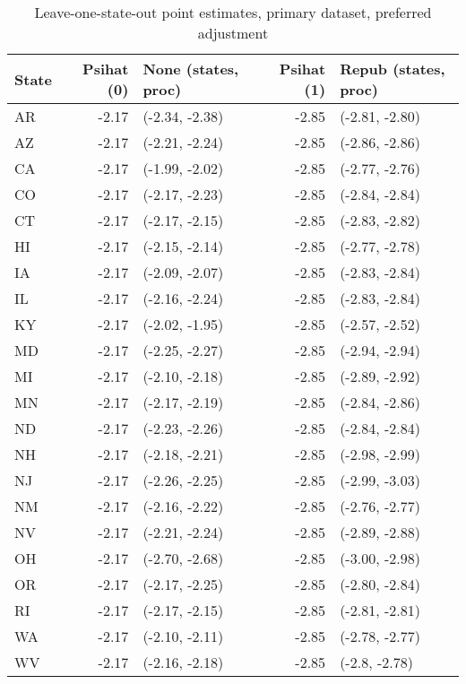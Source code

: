 \begin{table}[ht]
\centering
   \caption{Leave-one-state-out point estimates, primary dataset, preferred adjustment}
    \label{tab:loostatec1}
\begin{tabular}{lrlrl}
  \hline
State & Psihat (0) & None (states, proc) & Psihat (1) & Repub (states, proc) \\ 
  \hline
AR & -2.17 & (-2.34, -2.38) & -2.85 & (-2.81, -2.80) \\ 
  AZ & -2.17 & (-2.21, -2.24) & -2.85 & (-2.86, -2.86) \\ 
  CA & -2.17 & (-1.99, -2.02) & -2.85 & (-2.77, -2.76) \\ 
  CO & -2.17 & (-2.17, -2.23) & -2.85 & (-2.84, -2.84) \\ 
  CT & -2.17 & (-2.17, -2.15) & -2.85 & (-2.83, -2.82) \\ 
  HI & -2.17 & (-2.15, -2.14) & -2.85 & (-2.77, -2.78) \\ 
  IA & -2.17 & (-2.09, -2.07) & -2.85 & (-2.83, -2.84) \\ 
  IL & -2.17 & (-2.16, -2.24) & -2.85 & (-2.83, -2.84) \\ 
  KY & -2.17 & (-2.02, -1.95) & -2.85 & (-2.57, -2.52) \\ 
  MD & -2.17 & (-2.25, -2.27) & -2.85 & (-2.94, -2.94) \\ 
  MI & -2.17 & (-2.10, -2.18) & -2.85 & (-2.89, -2.92) \\ 
  MN & -2.17 & (-2.17, -2.19) & -2.85 & (-2.84, -2.86) \\ 
  ND & -2.17 & (-2.23, -2.26) & -2.85 & (-2.84, -2.84) \\ 
  NH & -2.17 & (-2.18, -2.21) & -2.85 & (-2.98, -2.99) \\ 
  NJ & -2.17 & (-2.26, -2.25) & -2.85 & (-2.99, -3.03) \\ 
  NM & -2.17 & (-2.16, -2.22) & -2.85 & (-2.76, -2.77) \\ 
  NV & -2.17 & (-2.21, -2.24) & -2.85 & (-2.89, -2.88) \\ 
  OH & -2.17 & (-2.70, -2.68) & -2.85 & (-3.00, -2.98) \\ 
  OR & -2.17 & (-2.17, -2.25) & -2.85 & (-2.80, -2.84) \\ 
  RI & -2.17 & (-2.17, -2.15) & -2.85 & (-2.81, -2.81) \\ 
  WA & -2.17 & (-2.10, -2.11) & -2.85 & (-2.78, -2.77) \\ 
  WV & -2.17 & (-2.16, -2.18) & -2.85 & (-2.8, -2.78) \\ 
   \hline
\end{tabular}
\end{table}

